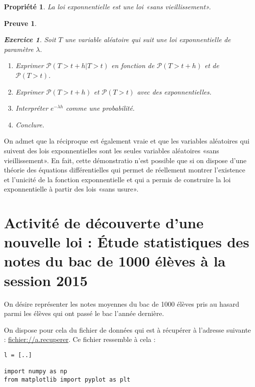 \documentclass[11pt,a4paper,french]{article}
\makeatletter
\renewcommand{\maketitle}%
{\framebox{%
    \begin{minipage}{1.0\linewidth}%
      \begin{center}%
        \Large \@title ~-- \@author \\%
        \@date%
      \end{center}%
    \end{minipage}}%
  \normalsize%
}
\newcommand{\p}{\mathcal{P}}
\theoremstyle{break}
\newtheorem{propriete}{Propriété}
\theoremstyle{plain}
\newtheorem{exerciceT}{Exercice}
\theoremstyle{nonumberplain}
\newtheorem{preuve}{Preuve}
\theoremstyle{nonumberbreak}
\newenvironment{exercice}{\begin{framed}\begin{exerciceT}}{\end{exerciceT}\end{framed}}
\makeatother
\begin{document}
\begin{propriete}
  La loi exponnentielle est une loi «sans vieillissement».
\end{propriete}
\begin{preuve}
  \begin{exercice}
    Soit $T$ une variable aléatoire qui suit une loi exponnentielle de
    paramètre $\lambda$.
    \begin{enumerate}
      \item Exprimer $\p(T > t+h | T > t)$ en fonction de $\p(T > t+h)$
        et de $\p(T > t)$.
      \item Exprimer $\p(T > t+h)$ et $\p(T > t)$ avec des
        exponnentielles.
      \item Interpréter $e^{-\lambda h}$ comme une probabilité.
      \item Conclure.
    \end{enumerate}
  \end{exercice}
\end{preuve}

On admet que la réciproque est également vraie et que les variables
aléatoires qui suivent des lois exponnentielles sont les seules
variables aléatoires «sans vieillissement». En fait, cette démonstratio
n'est possible que si on dispose d'une théorie des équations
différentielles qui permet de réellement montrer l'existence et
l'unicité de la fonction exponnentielle et qui a permis de construire la
loi exponnentielle à partir des lois «sans usure».

\pagebreak

\maketitle

\section*{Activité de découverte d'une nouvelle loi : Étude statistiques
des notes du bac de 1000 élèves à la session 2015}

On désire représenter les notes moyennes du bac de 1000 élèves pris au
hasard parmi les élèves qui ont passé le bac l'année dernière.

On dispose pour cela du fichier de données qui est à récupérer à
l'adresse suivante : \url{fichier://a.recuperer}. Ce fichier ressemble à
cela :
\begin{verbatim}
l = [..]

import numpy as np
from matplotlib import pyplot as plt
\end{verbatim}
\end{document}
